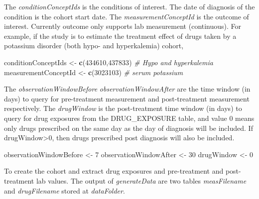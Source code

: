 \documentclass[]{article}
\newenvironment{Shaded}{\begin{snugshade}}{\end{snugshade}}
\newcommand{\CommentTok}[1]{\textcolor[rgb]{0.56,0.35,0.01}{\textit{#1}}}
\newcommand{\DecValTok}[1]{\textcolor[rgb]{0.00,0.00,0.81}{#1}}
\newcommand{\KeywordTok}[1]{\textcolor[rgb]{0.13,0.29,0.53}{\textbf{#1}}}
\newcommand{\NormalTok}[1]{#1}
\newcommand{\StringTok}[1]{\textcolor[rgb]{0.31,0.60,0.02}{#1}}
\begin{document}
The \emph{conditionConceptIds} is the conditions of interest. The date
of diagnosis of the condition is the cohort start date. The
\emph{measurementConceptId} is the outcome of interest. Currently
outcome only supports lab measurement (continuous). For example, if the
study is to estimate the treatment effect of drugs taken by a potassium
disorder (both hypo- and hyperkalemia) cohort,

\begin{Shaded}
\begin{Highlighting}[]
\NormalTok{conditionConceptIds \textless{}{-}}\StringTok{ }\KeywordTok{c}\NormalTok{(}\DecValTok{434610}\NormalTok{,}\DecValTok{437833}\NormalTok{) }\CommentTok{\# Hypo and hyperkalemia}
\NormalTok{measurementConceptId \textless{}{-}}\StringTok{ }\KeywordTok{c}\NormalTok{(}\DecValTok{3023103}\NormalTok{) }\CommentTok{\# serum potassium}
\end{Highlighting}
\end{Shaded}

The \emph{observationWindowBefore} \emph{observationWindowAfter} are the
time window (in days) to query for pre-treatment measurement and
post-treatment measurement respectively. The \emph{drugWindow} is the
post-treatment time window (in days) to query for drug exposures from
the DRUG\_EXPOSURE table, and value 0 means only drugs prescribed on the
same day as the day of diagnosis will be included. If
drugWindow\textgreater0, then drugs prescribed post diagnosis will also
be included.

\begin{Shaded}
\begin{Highlighting}[]
\NormalTok{observationWindowBefore \textless{}{-}}\StringTok{ }\DecValTok{7}
\NormalTok{observationWindowAfter \textless{}{-}}\StringTok{ }\DecValTok{30}
\NormalTok{drugWindow \textless{}{-}}\StringTok{ }\DecValTok{0}
\end{Highlighting}
\end{Shaded}

To create the cohort and extract drug exposures and pre-treatment and
post-treatment lab values. The output of \emph{generateData} are two
tables \emph{measFilename} and \emph{drugFilename} stored at
\emph{dataFolder}.
\end{document}
